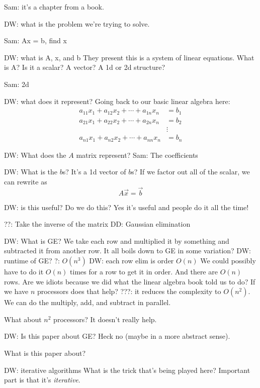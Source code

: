 Sam: it's a chapter from a book.

DW: what is the problem we're trying to solve.

Sam: Ax = b, find x

DW: what is A, x, and b
They present this is a system of linear equations.
What is A? Is it a scalar? A vector? A 1d or 2d structure?

Sam: 2d

DW: what does it represent?
Going back to our basic linear algebra here:
\begin{align*}
    a_{11} x_{1} + a_{12} x_{2} + \cdots + a_{1n} x_{n} &= b_{1} \\
    a_{21} x_{1} + a_{22} x_{2} + \cdots + a_{2n} x_{n} &= b_{2} \\
    & \vdots \\
    a_{n1} x_{1} + a_{n2} x_{2} + \cdots + a_{nn} x_{n} &= b_{n}
\end{align*}

DW: What does the \( A \) matrix represent?
Sam: The coefficients

DW: What is the \( b \)s?
It's a 1d vector of \( b \)s?
If we factor out all of the scalar, we can rewrite as
\[
A \vec{x} = \vec{b}
\]

DW: is this useful? Do we do this?
Yes it's useful and people do it all the time!

??: Take the inverse of the matrix
DD: Gaussian elimination

DW: What is GE?
We take each row and multiplied it by something and subtracted it from another row.
It all boils down to GE in some variation?
DW: runtime of GE?
?: \( O (n^3) \)
DW: each row elim is order \( O(n) \)
We could possibly have to do it \( O(n) \) times for a row to get it in order.
And there are \( O(n) \) rows.
Are we idiots because we did what the linear algebra book told us to do?
If we have \( n \) processors does that help?
???: it reduces the complexity to \( O(n^2) \).
We can do the multiply, add, and subtract in parallel.

What about \( n^2 \) processors?
It doesn't really help.

DW: Is this paper about GE? Heck no (maybe in a more abstract sense).

What is this paper about?

DW: iterative algorithms
What is the trick that's being played here?
Important part is that it's \textit{iterative}.

